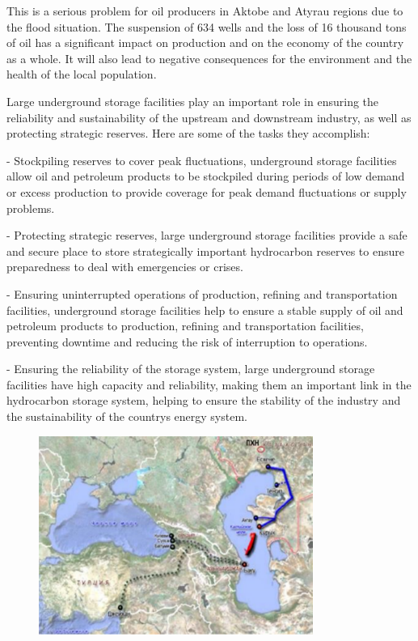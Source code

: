 This is a serious problem for oil producers in Aktobe and Atyrau regions
due to the flood situation. The suspension of 634 wells and the loss of
16 thousand tons of oil has a significant impact on production and on
the economy of the country as a whole. It will also lead to negative
consequences for the environment and the health of the local population.

Large underground storage facilities play an important role in ensuring
the reliability and sustainability of the upstream and downstream
industry, as well as protecting strategic reserves. Here are some of the
tasks they accomplish:

- Stockpiling reserves to cover peak fluctuations, underground storage
facilities allow oil and petroleum products to be stockpiled during
periods of low demand or excess production to provide coverage for peak
demand fluctuations or supply problems.

- Protecting strategic reserves, large underground storage facilities
provide a safe and secure place to store strategically important
hydrocarbon reserves to ensure preparedness to deal with emergencies or
crises.

- Ensuring uninterrupted operations of production, refining and
transportation facilities, underground storage facilities help to ensure
a stable supply of oil and petroleum products to production, refining
and transportation facilities, preventing downtime and reducing the risk
of interruption to operations.

- Ensuring the reliability of the storage system, large underground
storage facilities have high capacity and reliability, making them an
important link in the hydrocarbon storage system, helping to ensure the
stability of the industry and the sustainability of the
country\textquotesingle s energy system.

\begin{figure}[H]
	\centering
	\includegraphics[width=0.8\textwidth]{assets/304}
	\caption*{}
\end{figure}

